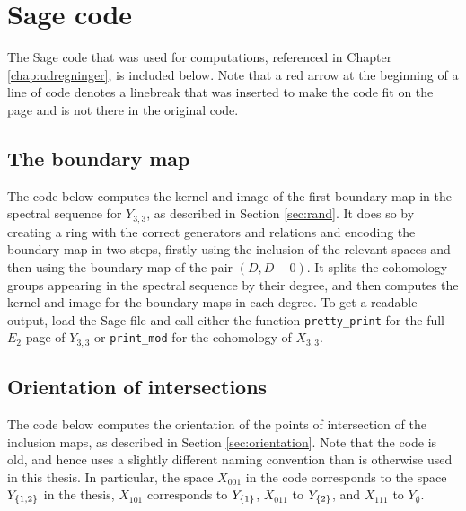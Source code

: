 
\chapter{Sage code} 
\label{appendix:sage}

The Sage code that was used for computations, referenced in Chapter
\ref{chap:udregninger}, is included below. Note that a red arrow at
the beginning of a line of code denotes a linebreak that was inserted
to make the code fit on the page and is not there in the original
code.

\section{The boundary map}
\label{sec:sageboundary}

The code below computes the kernel and image of the first boundary map
in the spectral sequence for $Y_{3,3}$, as described in Section
\ref{sec:rand}. It does so by creating a ring with the correct
generators and relations and encoding the boundary map in two steps,
firstly using the inclusion of the relevant spaces and then using the
boundary map of the pair $(D,D-0)$. It splits the cohomology
groups appearing in the spectral sequence by their degree, and then
computes 
the kernel and image for the boundary maps in each degree. To get a
readable output, load the
Sage file and call either the function \lstinline{pretty_print} for
the full $E_2$-page of $Y_{3,3}$ or \lstinline{print_mod} for the
cohomology of $X_{3,3}$.




\section{Orientation of intersections}
\label{sec:sageorientation}

The code below computes the orientation of the points of intersection
of the inclusion maps, as described in Section
\ref{sec:orientation}. Note that the code is old, and hence uses a
slightly different naming convention than is otherwise used in this
thesis. In particular, the space $X_{001}$ in the code corresponds to
the space $Y_{\left\{ 1,2 \right\}}$ in the thesis, $X_{101}$ corresponds to
$Y_{\left\{ 1 \right\}}$, $X_{011}$ to $Y_{\left\{ 2 \right\}}$, and $X_{111}$ to $Y_{\emptyset}$.





